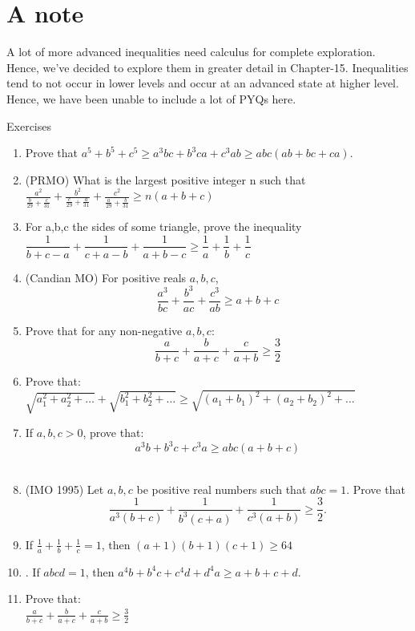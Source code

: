 \section{A note}
A lot of more advanced inequalities need calculus for complete exploration. Hence, we've decided to explore them in greater detail in Chapter-15.  Inequalities tend to not occur in lower levels and occur at an advanced state at higher level. Hence, we have been unable to include a lot of PYQs here. 
\begin{xcb}{Exercises}
\begin{enumerate}
\item Prove that $a^5 + b^5 + c^5 \geq a^3bc + b^3ca + c^3ab \geq abc(ab + bc + ca).$
\item (PRMO) What is the largest positive integer n such that $\frac{a^2}{\frac{b}{29} +\frac{c}{31}} +\frac{b^2}{\frac{c}{29}+\frac{a}{31}} +\frac{c^2}{\frac{a}{29}+\frac{b}{31}}\geq n(a+b+c)$
\item For a,b,c the sides of some triangle, prove the inequality $\dfrac{1}{b+c-a}+\dfrac{1}{c+a-b}+\dfrac{1}{a+b-c}\ge\dfrac1a+\dfrac1b+\dfrac1c$ 
\item (Candian MO) For positive reals $a,b,c$, \\
\[\frac{a^3}{bc}+\frac{b^3}{ac}+\frac{c^3}{ab} \geq a+b+c\]
\item Prove that for any non-negative $a,b,c$:\\
\[\frac{a}{b+c}+\frac{b}{a+c}+\frac{c}{a+b}\geq \frac{3}{2}\]
\item Prove that:\\
$\sqrt{a_1^2+a_2^2+\dots}+\sqrt{b_1^2+b_2^2+\dots} \geq \sqrt{(a_1+b_1)^2+(a_2+b_2)^2+\dots}$
\item If $a,b,c>0$, prove that:\\
\[a^3b+b^3c+c^3a \geq abc(a+b+c)\]\\
\item (IMO 1995) Let $a, b, c$ be positive real numbers such that $abc = 1$. Prove that\[\frac{1}{a^3(b+c)} + \frac{1}{b^3(c+a)} + \frac{1}{c^3(a+b)} \geq \frac{3}{2}.\]
\item If $\frac{1}{a}+\frac{1}{b}+\frac{1}{c}=1$, then $(a + 1)(b + 1)(c + 1) \geq 64$\\
\item . If $abcd = 1$, then $a^4b + b^4c + c^4d + d^4a \geq a + b + c + d$.
\item Prove that:\\
$\frac{a}{b+c}+\frac{b}{a+c}+\frac{c}{a+b} \geq  \frac{3}{2}$\\

\end{enumerate}
\end{xcb}
